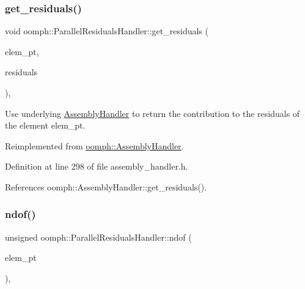 \subsubsection{\texorpdfstring{get\+\_\+residuals()}{get\_residuals()}}
{\footnotesize\ttfamily void oomph\+::\+Parallel\+Residuals\+Handler\+::get\+\_\+residuals (\begin{DoxyParamCaption}\item[{\hyperlink{classoomph_1_1GeneralisedElement}{Generalised\+Element} $\ast$const \&}]{elem\+\_\+pt,  }\item[{\hyperlink{classoomph_1_1Vector}{Vector}$<$ double $>$ \&}]{residuals }\end{DoxyParamCaption})\hspace{0.3cm}{\ttfamily [inline]}, {\ttfamily [virtual]}}



Use underlying \hyperlink{classoomph_1_1AssemblyHandler}{Assembly\+Handler} to return the contribution to the residuals of the element elem\+\_\+pt. 



Reimplemented from \hyperlink{classoomph_1_1AssemblyHandler_a7a6203b0ab90da62b4da2af8a26d08b3}{oomph\+::\+Assembly\+Handler}.



Definition at line 298 of file assembly\+\_\+handler.\+h.



References oomph\+::\+Assembly\+Handler\+::get\+\_\+residuals().

\mbox{\label{classoomph_1_1ParallelResidualsHandler_a16eb9ec097e85c5da57b2e588d9683b6}} 
\subsubsection{\texorpdfstring{ndof()}{ndof()}}
{\footnotesize\ttfamily unsigned oomph\+::\+Parallel\+Residuals\+Handler\+::ndof (\begin{DoxyParamCaption}\item[{\hyperlink{classoomph_1_1GeneralisedElement}{Generalised\+Element} $\ast$const \&}]{elem\+\_\+pt }\end{DoxyParamCaption})\hspace{0.3cm}{\ttfamily [inline]}, {\ttfamily [virtual]}}



